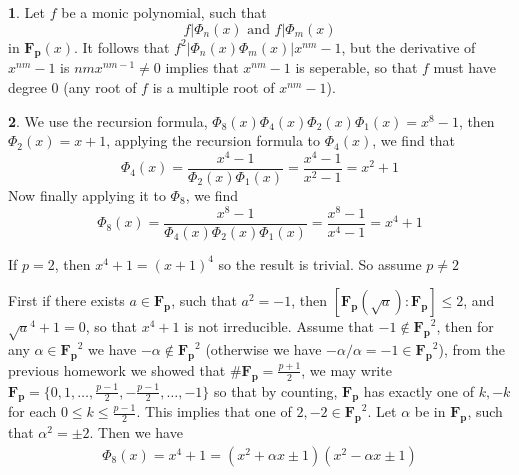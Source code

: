 \documentclass[11pt]{article}
\theoremstyle{definition}
\newtheorem{pb}{}
\newcommand{\set}[1]{\{#1\}}
\newcommand{\tand}{\text{ and }}
\begin{document}
    \begin{pb}
        Let \(f\) be a monic polynomial, such that \[f \vert \Phi_n(x) \tand f \vert \Phi_m(x)\] in \(\mathbf{F_p}(x)\). It follows that \(f^2 \vert \Phi_n(x)\Phi_m(x) \vert x^{nm} - 1\), but
        the derivative of \(x^{nm} - 1\) is \(nmx^{nm-1} \neq 0\) implies that \(x^{nm} - 1\) is seperable, so that \(f\) must have degree \(0\) (any root of \(f\) is a multiple root of \(x^{nm}-1\)).
    \end{pb}
    \begin{pb}
        We use the recursion formula, \(\Phi_8(x)\Phi_4(x)\Phi_2(x)\Phi_1(x) = x^8 - 1\), then
        \(\Phi_2(x) = x+1\), applying the recursion formula to \(\Phi_4(x)\), we find that
        \[\Phi_4(x) = \frac{x^4-1}{\Phi_2(x)\Phi_1(x)} = \frac{x^4-1}{x^2 - 1} = x^2 + 1\]
        Now finally applying it to \(\Phi_8\), we find
        \[\Phi_8(x) = \frac{x^8-1}{\Phi_4(x)\Phi_2(x)\Phi_1(x)} 
        =\frac{x^8-1}{x^4-1} = x^4 + 1\]

        If \(p = 2\), then \(x^4 + 1 = (x+1)^4\) so the result is trivial. So assume \(p \neq 2\)

        First if there exists \(a \in \mathbf{F_p}\), such that \(a^2 = -1\), then \([\mathbf{F_p}(\sqrt{a}):\mathbf{F_p}] \leq 2\), and \(\sqrt{a}^4 + 1 = 0\), so that \(x^4 + 1\) is not irreducible. Assume that \(-1 \not \in \mathbf{F_p}^2\), then for any \(\alpha \in \mathbf{F_p}^2\) we have \(-\alpha \not \in \mathbf{F_p}^2\) (otherwise we have \(-\alpha/\alpha = -1 \in \mathbf{F_p}^2\)), from the previous homework we showed that \(\# \mathbf{F_p} = \frac{p+1}{2}\), we may write \(\mathbf{F_p} = \set{0,1,\hdots,\frac{p-1}{2}, -\frac{p-1}{2},\hdots,-1}\) so that by counting, \(\mathbf{F_p}\) has exactly one of \(k,-k\) for each \(0 \leq k \leq \frac{p-1}{2}\). This implies that one of \(2,-2 \in \mathbf{F_p}^2\). Let \(\alpha\) be in \(\mathbf{F_p}\), such that \(\alpha^2 = \pm 2\). Then we have
        \begin{align*}
            \Phi_8(x) = x^4 + 1 = (x^2 + \alpha x \pm 1)(x^2 - \alpha x \pm 1)
        \end{align*}
    \end{pb}
\end{document}
